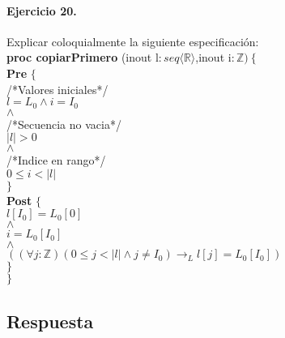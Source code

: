 \documentclass[a4paper]{article}
\begin{document}
\paragraph*{Ejercicio 20.} Explicar coloquialmente la siguiente especificación:\medskip \\
			\textbf{proc copiarPrimero }(inout l$: seq\langle
				 \mathbb{R}\rangle$,inout i$:\mathbb{Z})
			\ \{$\smallskip \\
			\hspace*{6mm} \textbf{Pre }$\{$\\
			\hspace*{6mm} /*Valores iniciales*/\\
			\hspace*{6mm} $l=L_0\wedge i=I_0$\\
			\hspace*{6mm} $\wedge$\\
			\hspace*{6mm} /*Secuencia no vacia*/\\
			\hspace*{6mm} $|l|>0$\\
			\hspace*{6mm} $\wedge$\\
			\hspace*{6mm} /*Indice en rango*/\\
			\hspace*{6mm} $0\leq i <|l|$\\
			\hspace*{6mm} $\}$\\
			\hspace*{6mm} \textbf{Post }$\{$\\
			\hspace*{6mm} $l[I_0]=L_0[0]$\\
			\hspace*{6mm} $\wedge$\\
			\hspace*{6mm} $i=L_0[I_0]$\\
			\hspace*{6mm} $\wedge$\\
			\hspace*{6mm} $((\forall j:\mathbb{Z})(0\leq j<|l|\wedge j\neq I_0)
							\rightarrow_L l[j]=L_0[I_0])$\\
			\hspace*{6mm} $\}$\\
			$\}$
	
\subsection*{Respuesta}
	
\end{document}

